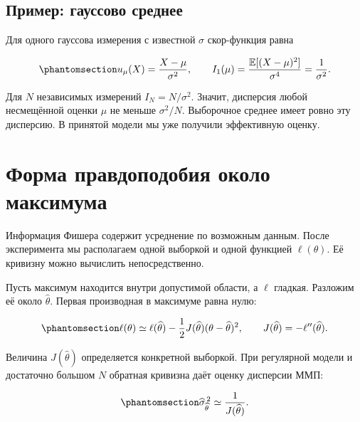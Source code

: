 \documentclass[
  russian,
  11pt,
  a4paper,
  open=any]{scrbook}
\begin{document}
\subsection{Пример: гауссово
среднее}\label{ux43fux440ux438ux43cux435ux440-ux433ux430ux443ux441ux441ux43eux432ux43e-ux441ux440ux435ux434ux43dux435ux435}

Для одного гауссова измерения с известной \(\sigma\) скор-функция равна

\begin{equation}\protect\phantomsection\label{eq-ch10-gaussian-information}{
u_\mu(X)=\frac{X-\mu}{\sigma^2},
\qquad
I_1(\mu)=\frac{\mathbb E[(X-\mu)^2]}{\sigma^4}
=\frac1{\sigma^2}.
}\end{equation}

Для \(N\) независимых измерений \(I_N=N/\sigma^2\). Значит, дисперсия
любой несмещённой оценки \(\mu\) не меньше \(\sigma^2/N\). Выборочное
среднее имеет ровно эту дисперсию. В принятой модели мы уже получили
эффективную оценку.

\section{Форма правдоподобия около
максимума}\label{ux444ux43eux440ux43cux430-ux43fux440ux430ux432ux434ux43eux43fux43eux434ux43eux431ux438ux44f-ux43eux43aux43eux43bux43e-ux43cux430ux43aux441ux438ux43cux443ux43cux430}

Информация Фишера содержит усреднение по возможным данным. После
эксперимента мы располагаем одной выборкой и одной функцией
\(\ell(\theta)\). Её кривизну можно вычислить непосредственно.

Пусть максимум находится внутри допустимой области, а \(\ell\) гладкая.
Разложим её около \(\widehat\theta\). Первая производная в максимуме
равна нулю:

\begin{equation}\protect\phantomsection\label{eq-ch10-likelihood-taylor}{
\ell(\theta)\simeq\ell(\widehat\theta)
-\frac12J(\widehat\theta)(\theta-\widehat\theta)^2,
\qquad
J(\widehat\theta)=-\ell''(\widehat\theta).
}\end{equation}

Величина \(J(\widehat\theta)\) определяется конкретной выборкой. При
регулярной модели и достаточно большом \(N\) обратная кривизна даёт
оценку дисперсии ММП:

\begin{equation}\protect\phantomsection\label{eq-ch10-curvature-error}{
\widehat\sigma_{\widehat\theta}^{\,2}
\simeq\frac1{J(\widehat\theta)}.
}\end{equation}
\end{document}
